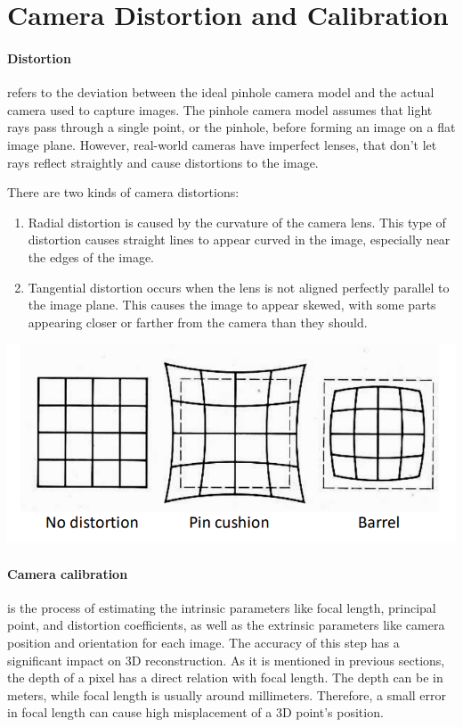 \documentclass[11pt]{article}
\begin{document}
    \section{Camera Distortion and Calibration}

    \paragraph{Distortion} refers to the deviation between the ideal pinhole camera model and the actual camera
    used to capture images. The pinhole camera model assumes that light rays pass through a single point, or
    the pinhole, before forming an image on a flat image plane. However, real-world cameras have imperfect
    lenses, that don't let rays reflect straightly and cause distortions to the image.

    There are two kinds of camera distortions:

    \begin{enumerate}
        \item Radial distortion is caused by the curvature of the camera lens. This type of distortion
        causes straight lines to appear curved in the image, especially near the edges of the image.
        \item Tangential distortion occurs when the lens is not aligned perfectly parallel to the image plane.
        This causes the image to appear skewed, with some parts appearing closer or farther from the camera
        than they should.
    \end{enumerate}
    {\includegraphics[width=\textwidth,height=\textheight,keepaspectratio]{distortion.PNG}}

    \paragraph{Camera calibration} is the process of estimating the intrinsic parameters like focal length,
    principal point, and distortion coefficients, as well as the extrinsic parameters like camera position
    and orientation for each image. The accuracy of this step has a significant impact on 3D reconstruction.
    As it is mentioned in previous sections, the depth of a pixel has a direct relation with focal length. The depth
    can be in meters, while focal length is usually around millimeters. Therefore, a small error in focal length
    can cause high misplacement of a 3D point's position.
\end{document}
